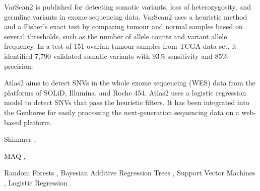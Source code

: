 \documentclass[11pt,reqno]{amsart}
\begin{document}
VarScan2 \citep{Koboldt2012} is published for detecting somatic variants, loss of heterozygosity, and germline variants in exome sequencing data.
VarScan2 uses a heuristic method and a Fisher's exact test by comparing tumour and normal samples based on several thresholds, such as the number of allele counts and variant allele frequency.
In a test of 151 ovarian tumour samples from TCGA data set, it identified 7,790 validated somatic variants with 93\% sensitivity and 85\% precision.

Atlas2 \citep{challis2012integrative} aims to detect SNVs in the whole exome sequencing (WES) data from the platforms of SOLiD, Illumina, and Roche 454.
Atlas2 uses a logistic regression model to detect SNVs that pass the heuristic filters.
It has been integrated into the Genboree for easily processing the next-generation sequencing data on a web-based platform.

Shimmer \citep{Hansen2013},

MAQ \citep{Li2008},

Random Forests \citep{Ding2012},
Bayesian Additive Regression Trees \citep{Ding2012},
Support Vector Machines \citep{Ding2012},
Logistic Regression \citep{Ding2012}.




\end{document}
